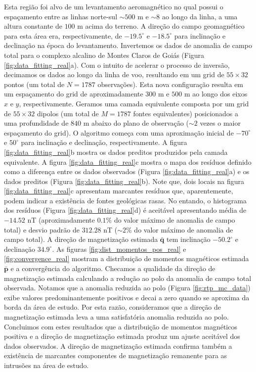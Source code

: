 Esta região foi alvo de um levantamento aeromagnético no qual possui o espaçamento entre as linhas norte-sul $\sim 500$ m e $\sim 8$ ao longo da linha, a uma altura constante de $100$ m acima do terreno. A direção do campo geomagnético para esta área era, respectivamente, de $-19.5^\circ$ e $-18.5^\circ$ para inclinação e declinação na época do levantamento. Invertemos os dados de anomalia de campo total para o complexo alcalino de Montes Claros de Goiás (Figura \ref{fig:data_fitting_real}a). Com o intuito de acelerar o processo de inversão, decimamos os dados ao longo da linha de voo, resultando em um grid de $55 \times 32$ pontos (um total de $N=1787$ observações). Esta nova configuração resulta em um espaçamento do grid de aproximadamente $300$ m e $500$ m ao longo dos eixos $x$ e $y$, respectivamente. Geramos uma camada equivalente composta por um grid de $55 \times 32$ dipolos (um total de $M=1787$ fontes equivalentes) posicionados a uma profundidade de $840$ m abaixo do plano de observação ($\sim 2$ vezes o maior espaçamento do grid). O algoritmo começa com uma aproximação inicial de $-70^\circ$ e $50^\circ$ para inclinação e declinação, respectivamente. A figura \ref{fig:data_fitting_real}b mostra os dados preditos produzidos pela camada equivalente. A figura \ref{fig:data_fitting_real}c mostra o mapa dos resíduos definido como a diferença entre os dados observados (Figura \ref{fig:data_fitting_real}a) e os dados preditos (Figura \ref{fig:data_fitting_real}b). Note que, dois locais na figura \ref{fig:data_fitting_real}c apresentam marcantes resíduos que, aparentemente, podem indicar a existência de fontes geológicas rasas. No entando, o histograma dos resíduos (Figura \ref{fig:data_fitting_real}d) é aceitável apresentando média de $-14.52$ nT (aproximadamente $0.1\% $ do valor máximo de anomalia de campo total) e desvio padrão de $312.28$ nT ($\sim 2 \% $ do valor máximo de anomalia de campo total). A direção de magnetização estimada $\bar{\mathbf{q}}$ tem inclinação $-50.2^\circ$ e declinação $34.9^\circ$. As figuras \ref{fig:dist_momentos_pos_real} e \ref{fig:convergence_real} mostram a distribuição de momentos magnéticos estimada $\bar{\mathbf{p}}$ e a convergência do algoritmo. Checamos a qualidade da direção de magnetização estimada calculando a redução ao polo da anomalia de campo total observada. Notamos que a anomalia reduzida ao polo (Figura \ref{fig:rtp_mc_data}) exibe valores predominantemente positivos e decai a zero quando se aproxima da borda da área de estudo. Por esta razão, consideramos que a direção de magnetização estimada leva a uma satisfatória anomalia reduzida ao polo. Concluimos com estes resultados que a distribuição de momentos magnéticos positiva e a direção de magnetização estimada produz um ajuste aceitável dos dados observados. A direção de magnetização estimada confirma também a existência de marcantes componentes de magnetização remanente para as intrusões na área de estudo.  

